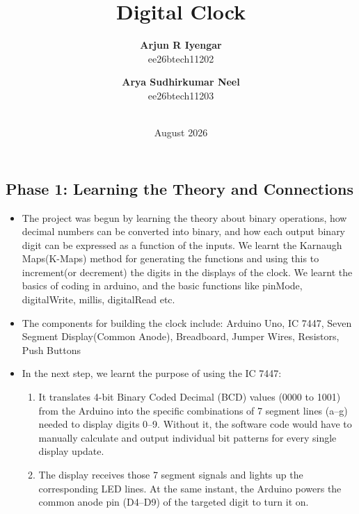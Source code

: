 \documentclass[11pt,a4paper]{article}
\title{Digital Clock}
\author{
  \textbf{Arjun R Iyengar} \\
  \small ee26btech11202\\
  \and
  \textbf{Arya Sudhirkumar Neel} \\
  \small ee26btech11203\\ \\}
\date{August 2026}
\begin{document}
\maketitle

\begin{center}
\section*{Phase 1: Learning the Theory and Connections}
\end{center}

\begin{itemize}
    \item The project was begun by learning the theory about binary operations, how decimal numbers can be converted into binary, and how each output binary digit can be expressed as a function of the inputs. We learnt the Karnaugh Maps(K-Maps) method for generating the functions and using this to increment(or decrement) the digits in the displays of the clock. We learnt the basics of coding in arduino, and the basic functions like pinMode, digitalWrite, millis, digitalRead etc.
    \item The components for building the clock include: Arduino Uno, IC 7447, Seven Segment Display(Common Anode), Breadboard, Jumper Wires, Resistors, Push Buttons
    \item In the next step, we learnt the purpose of using the IC 7447:    \begin{enumerate}
    \item It translates 4-bit Binary Coded Decimal (BCD) values (0000 to 1001) from the Arduino into the specific combinations of 7 segment lines (a–g) needed to display digits 0–9. Without it, the software code would have to manually calculate and output individual bit patterns for every single display update.
    \item The display receives those 7 segment signals and lights up the corresponding LED lines. At the same instant, the Arduino powers the common anode pin (D4–D9) of the targeted digit to turn it on.
   

\end{enumerate}
\end{itemize}
\end{document}
